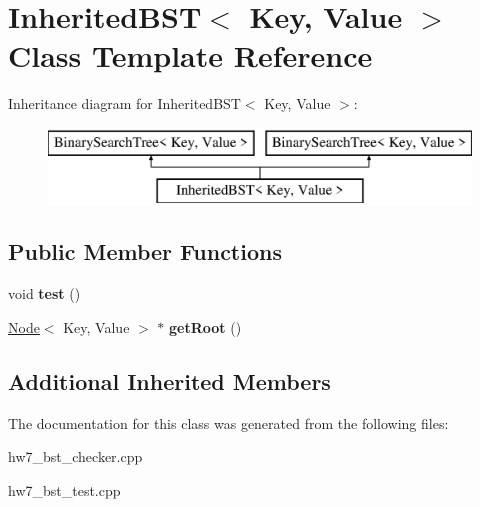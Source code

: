 \hypertarget{classInheritedBST}{}\section{Inherited\+B\+ST$<$ Key, Value $>$ Class Template Reference}
\label{classInheritedBST}
Inheritance diagram for Inherited\+B\+ST$<$ Key, Value $>$\+:\begin{figure}[H]
\begin{center}
\leavevmode
\includegraphics[height=2.000000cm]{classInheritedBST}
\end{center}
\end{figure}
\subsection*{Public Member Functions}
\begin{DoxyCompactItemize}
\item 
\mbox{\label{classInheritedBST_a4d08c97a828ea6a3af0a13c29d77250b}} 
void {\bfseries test} ()
\item 
\mbox{\label{classInheritedBST_a2335cb24692ddfe4b8a140a7b9ba0029}} 
\mbox{\hyperlink{classNode}{Node}}$<$ Key, Value $>$ $\ast$ {\bfseries get\+Root} ()
\end{DoxyCompactItemize}
\subsection*{Additional Inherited Members}


The documentation for this class was generated from the following files\+:\begin{DoxyCompactItemize}
\item 
hw7\+\_\+bst\+\_\+checker.\+cpp\item 
hw7\+\_\+bst\+\_\+test.\+cpp\end{DoxyCompactItemize}
